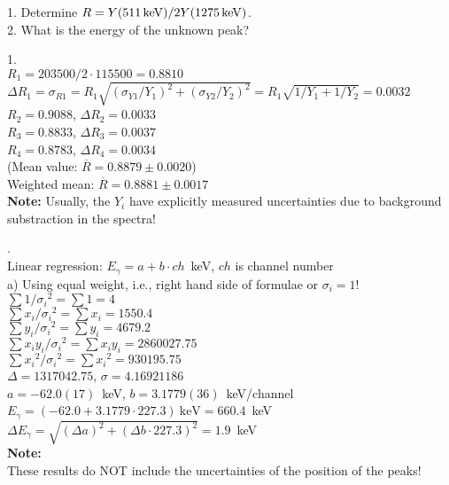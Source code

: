 \documentclass[12pt]{article}
\begin{document}
1. Determine $R=Y(511\,{\rm keV})/2Y(1275\,{\rm keV})$.\\
2. What is the energy of the unknown peak?
\vspace*{4mm}

1.\\
$R_1=203500/2\cdot 115500= 0.8810$\\
$\Delta R_1=\sigma_{R1}=R_1\sqrt{(\sigma_{Y1}/Y_1)^2+(\sigma_{Y2}/Y_2)^2}
          =R_1\sqrt{1/Y_1+1/Y_2}=0.0032$\\
$R_2=0.9088$, $\Delta R_2=0.0033$\\
$R_3=0.8833$, $\Delta R_3=0.0037$\\
$R_4=0.8783$, $\Delta R_4=0.0034$\\

(Mean value: $\overline{R}= 0.8879 \pm 0.0020$)\\
Weighted mean: $\overline{R}= 0.8881 \pm 0.0017$\\

{\bf Note:} Usually, the $Y_i$ have explicitly measured uncertainties
due to background substraction in the spectra!

.\\
Linear regression: $E_\gamma = a + b\cdot ch$~keV, $ch$ is channel number\\

a) Using equal weight, i.e., right hand side of formulae or $\sigma_i=1$!\\

$\sum{1/{\sigma_i}^2} = \sum{1} = 4$\\
$\sum{x_i/{\sigma_i}^2} = \sum{x_i} = 1550.4$\\
$\sum{y_i/{\sigma_i}^2} = \sum{y_i} = 4679.2$\\
$\sum{x_iy_i/{\sigma_i}^2} = \sum{x_iy_i} = 2860027.75$\\
$\sum{{x_i}^2/{\sigma_i}^2} = \sum{{x_i}^2} = 930195.75$\\
$\Delta=1317042.75$, $\sigma=4.16921186$\\

$a=-62.0(17)$~keV, $b=3.1779(36)$~keV/channel\\

$E_\gamma=(-62.0 + 3.1779\cdot 227.3)~\mbox{keV} = 660.4$~keV\\
$\Delta E_\gamma=\sqrt{(\Delta a)^2 + (\Delta b\cdot 227.3)^2} = 1.9$~keV\\

{\bf Note:}\\
These results do NOT include the uncertainties of the
position of the peaks!\\
\end{document}
